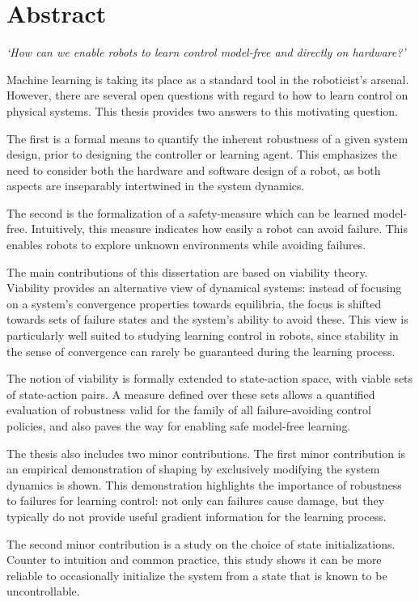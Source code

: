 
\chapter*{Abstract}
\emph{`How can we enable robots to learn control model-free and directly on hardware?'} \par
Machine learning is taking its place as a standard tool in the roboticist's arsenal. However, there are several open questions with regard to how to learn control on physical systems. This thesis provides two answers to this motivating question. \par
The first is a formal means to quantify the inherent robustness of a given system design, prior to designing the controller or learning agent. This emphasizes the need to consider both the hardware and software design of a robot, as both aspects are inseparably intertwined in the system dynamics. \par
The second is the formalization of a safety-measure which can be learned model-free. Intuitively, this measure indicates how easily a robot can avoid failure. This enables robots to explore unknown environments while avoiding failures. \par
The main contributions of this dissertation are based on viability theory. Viability provides an alternative view of dynamical systems: instead of focusing on a system's convergence properties towards equilibria, the focus is shifted towards sets of failure states and the system's ability to avoid these. This view is particularly well suited to studying learning control in robots, since stability in the sense of convergence can rarely be guaranteed during the learning process. \par
The notion of viability is formally extended to state-action space, with viable sets of state-action pairs. A measure defined over these sets allows a quantified evaluation of robustness valid for the family of all failure-avoiding control policies, and also paves the way for enabling safe model-free learning. \par
The thesis also includes two minor contributions. The first minor contribution is an empirical demonstration of shaping by exclusively modifying the system dynamics is shown. This demonstration highlights the importance of robustness to failures for learning control: not only can failures cause damage, but they typically do not provide useful gradient information for the learning process. \par
The second minor contribution is a study on the choice of state initializations. Counter to intuition and common practice, this study shows it can be more reliable to occasionally initialize the system from a state that is known to be uncontrollable. 